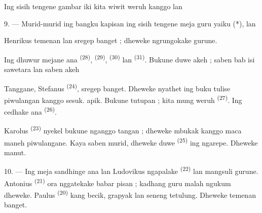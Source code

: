 Ing sisih tengene gambar iki kita wiwit weruh  kanggo  lan 


\VUsaut{2.4mm}

\VUsaut{3.0mm}

9. --- Murid-murid ing bangku kapisan ing sisih tengene meja guru
yaiku  (*),  lan 

Henrikus temenan lan sregep banget ; dheweke ngrungokake gurune.

Ing dhuwur mejane ana  \textsuperscript{(28)},
 \textsuperscript{(29)}, 
\textsuperscript{(30)} lan 
\textsuperscript{(31)}. Bukune duwe akeh  ; saben bab isi
sawetara  lan saben  akeh

Tanggane, Stefanus \textsuperscript{(24)}, sregep banget. Dheweke
nyathet ing buku tulise piwulangan kanggo sesuk. 
apik. Bukune tutupan ; kita mung weruh 
\textsuperscript{(27)}. Ing cedhake ana 
\textsuperscript{(26)}.

Karolus \textsuperscript{(23)} nyekel bukune nganggo tangan ; dheweke
mbukak kanggo maca maneh piwulangane. Kaya saben murid, dheweke duwe
 \textsuperscript{(25)} ing ngarepe. Dheweke
manut.

10. --- Ing meja sandhinge ana  
lan  Ludovikus ngapalake 
\textsuperscript{(22)} lan mangsuli 
gurune. Antonius \textsuperscript{(21)} ora nggatekake babar pisan ;
kadhang guru malah ngukum dheweke. Paulus \textsuperscript{(20)}
 kang becik, grapyak lan seneng tetulung. Dheweke
temenan banget.

